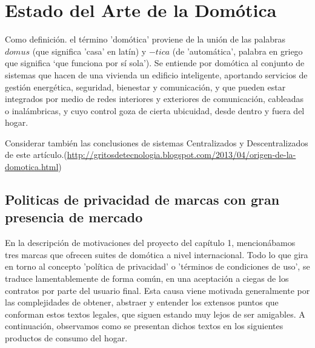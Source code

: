 \cleardoublepage

\chapter{Estado del Arte de la Domótica}
\label{ch:Capitulo2}

Como definición. el término 'domótica' proviene de la unión de las palabras $domus$ (que significa 'casa' en latín) y $-tica$ (de 'automática', palabra en griego que significa ‘que funciona por sí sola’). Se entiende por domótica al conjunto de sistemas que hacen de una vivienda un edificio inteligente, aportando servicios de gestión energética, seguridad, bienestar y comunicación, y que pueden estar integrados por medio de redes interiores y exteriores de comunicación, cableadas o inalámbricas, y cuyo control goza de cierta ubicuidad, desde dentro y fuera del hogar.


Considerar también las conclusiones de sistemas Centralizados y Descentralizados de este artículo.(\url{http://gritosdetecnologia.blogspot.com/2013/04/origen-de-la-domotica.html})


\section{Politicas de privacidad de marcas con gran presencia de mercado}
\label{ch:Capitulo2.1}

En la descripción de motivaciones del proyecto del capítulo 1, mencionábamos tres marcas que ofrecen suites de domótica a nivel internacional. Todo lo que gira en torno al concepto 'política de privacidad' o 'términos de condiciones de uso', se traduce lamentablemente de forma común, en una aceptación a ciegas de los contratos por parte del usuario final. Esta causa viene motivada generalmente por las complejidades de obtener, abstraer y entender los extensos puntos que conforman estos textos legales, que siguen estando muy lejos de ser amigables. A continuación, observamos como se presentan dichos textos en los siguientes productos de consumo del hogar.

